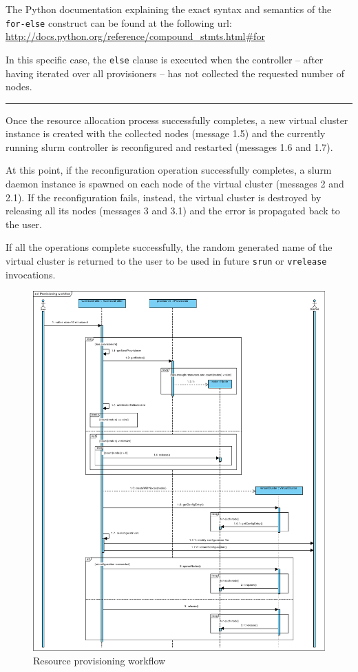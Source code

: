 The Python documentation explaining the exact syntax and semantics of the \texttt{for-else} construct can be found at the following url: \url{http://docs.python.org/reference/compound_stmts.html#for}

In this specific case, the \texttt{else} clause is executed when the controller – after having iterated over all provisioners – has not collected the requested number of nodes.\\
\vspace{-4mm}\rule{\textwidth}{.3pt}
\vspace*{1mm}

Once the resource allocation process successfully completes, a new virtual cluster instance is created with the collected nodes (message 1.5) and the currently running \gls{slurm} controller is reconfigured and restarted (messages 1.6 and 1.7).

At this point, if the reconfiguration operation successfully completes, a \gls{slurm} daemon instance is spawned on each node of the virtual cluster (messages 2 and 2.1). If the reconfiguration fails, instead, the virtual cluster is destroyed by releasing all its nodes (messages 3 and 3.1) and the error is propagated back to the user.

If all the operations complete successfully, the random generated name of the virtual cluster is returned to the user to be used in future \texttt{srun} or \texttt{vrelease} invocations.

\begin{figure}[p]
	\centering
	\includegraphics[width=1\textwidth]{figures/provisioning-workflow}
	\caption{Resource provisioning workflow}
	\label{fig:provisioning}
\end{figure}


